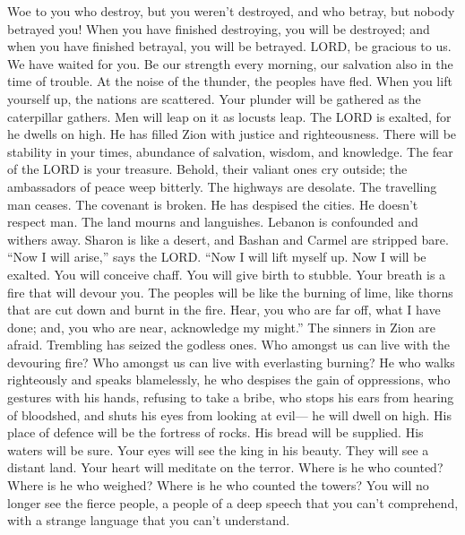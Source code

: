  Woe to you who destroy, but you weren't destroyed, and
who betray, but nobody betrayed you! When you have finished destroying,
you will be destroyed; and when you have finished betrayal, you will be
betrayed.  LORD, be gracious to us. We have waited for
you. Be our strength every morning, our salvation also in the time of
trouble.  At the noise of the thunder, the peoples have
fled. When you lift yourself up, the nations are scattered.
 Your plunder will be gathered as the caterpillar gathers.
Men will leap on it as locusts leap.  The LORD is exalted,
for he dwells on high. He has filled Zion with justice and
righteousness.  There will be stability in your times,
abundance of salvation, wisdom, and knowledge. The fear of the LORD is
your treasure.  Behold, their valiant ones cry outside;
the ambassadors of peace weep bitterly.  The highways are
desolate. The travelling man ceases. The covenant is broken. He has
despised the cities. He doesn't respect man.  The land
mourns and languishes. Lebanon is confounded and withers away. Sharon is
like a desert, and Bashan and Carmel are stripped bare. 
``Now I will arise,'' says the LORD. ``Now I will lift myself up. Now I
will be exalted.  You will conceive chaff. You will give
birth to stubble. Your breath is a fire that will devour you.
 The peoples will be like the burning of lime, like
thorns that are cut down and burnt in the fire.  Hear,
you who are far off, what I have done; and, you who are near,
acknowledge my might.''  The sinners in Zion are afraid.
Trembling has seized the godless ones. Who amongst us can live with the
devouring fire? Who amongst us can live with everlasting burning?
 He who walks righteously and speaks blamelessly, he who
despises the gain of oppressions, who gestures with his hands, refusing
to take a bribe, who stops his ears from hearing of bloodshed, and shuts
his eyes from looking at evil---  he will dwell on high.
His place of defence will be the fortress of rocks. His bread will be
supplied. His waters will be sure.  Your eyes will see
the king in his beauty. They will see a distant land. 
Your heart will meditate on the terror. Where is he who counted? Where
is he who weighed? Where is he who counted the towers? 
You will no longer see the fierce people, a people of a deep speech that
you can't comprehend, with a strange language that you can't understand.
